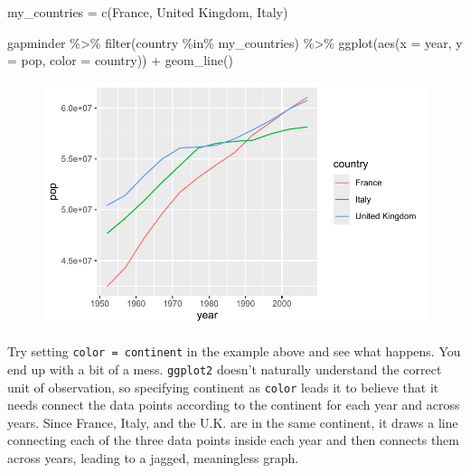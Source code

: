 \documentclass[
  letterpaper,
]{book}
\newenvironment{Shaded}{\begin{snugshade}}{\end{snugshade}}
\newcommand{\AttributeTok}[1]{\textcolor[rgb]{0.40,0.45,0.13}{#1}}
\newcommand{\FunctionTok}[1]{\textcolor[rgb]{0.28,0.35,0.67}{#1}}
\newcommand{\NormalTok}[1]{\textcolor[rgb]{0.00,0.23,0.31}{#1}}
\newcommand{\OtherTok}[1]{\textcolor[rgb]{0.00,0.23,0.31}{#1}}
\newcommand{\SpecialCharTok}[1]{\textcolor[rgb]{0.37,0.37,0.37}{#1}}
\newcommand{\StringTok}[1]{\textcolor[rgb]{0.13,0.47,0.30}{#1}}
\begin{document}
\begin{Shaded}
\begin{Highlighting}[]
\NormalTok{my\_countries }\OtherTok{=} \FunctionTok{c}\NormalTok{(}\StringTok{\textquotesingle{}France\textquotesingle{}}\NormalTok{, }\StringTok{\textquotesingle{}United Kingdom\textquotesingle{}}\NormalTok{, }\StringTok{\textquotesingle{}Italy\textquotesingle{}}\NormalTok{)}

\NormalTok{gapminder }\SpecialCharTok{\%\textgreater{}\%}
  \FunctionTok{filter}\NormalTok{(country }\SpecialCharTok{\%in\%}\NormalTok{ my\_countries) }\SpecialCharTok{\%\textgreater{}\%}
  \FunctionTok{ggplot}\NormalTok{(}\FunctionTok{aes}\NormalTok{(}\AttributeTok{x =}\NormalTok{ year, }
             \AttributeTok{y =}\NormalTok{ pop, }
             \AttributeTok{color =}\NormalTok{ country)) }\SpecialCharTok{+}
  \FunctionTok{geom\_line}\NormalTok{()}
\end{Highlighting}
\end{Shaded}

\begin{figure}[H]

{\centering \includegraphics{visualizing-with-ggplot_files/figure-pdf/unnamed-chunk-28-1.pdf}

}

\end{figure}

Try setting \texttt{color\ =\ continent} in the example above and see
what happens. You end up with a bit of a mess. \texttt{ggplot2} doesn't
naturally understand the correct unit of observation, so specifying
continent as \texttt{color} leads it to believe that it needs connect
the data points according to the continent for each year and across
years. Since France, Italy, and the U.K. are in the same continent, it
draws a line connecting each of the three data points inside each year
and then connects them across years, leading to a jagged, meaningless
graph.
\end{document}
